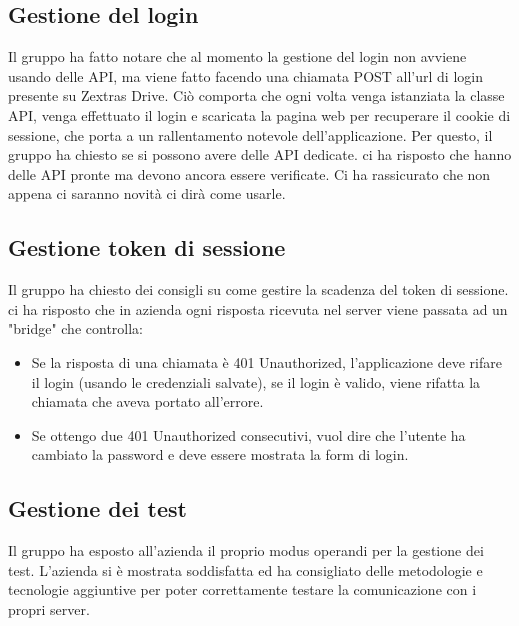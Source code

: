 \subsection{Gestione del login}
Il gruppo ha fatto notare che al momento la gestione del login non avviene usando delle API, ma viene fatto facendo una chiamata POST all'url di login presente su Zextras Drive.
Ciò comporta che ogni volta venga istanziata la classe API, venga effettuato il login e scaricata la pagina web per recuperare il cookie di sessione, che porta a un rallentamento notevole dell'applicazione. Per questo, il gruppo ha chiesto se si possono avere delle API dedicate. \textit{\Federico{}} ci ha risposto che hanno delle API pronte ma devono ancora essere verificate. Ci ha rassicurato che non appena ci saranno novità ci dirà come usarle.

\subsection{Gestione token di sessione}
Il gruppo ha chiesto dei consigli su come gestire la scadenza del token di sessione. \textit{\Alessio{}} ci ha risposto che in azienda ogni risposta ricevuta nel server viene passata ad un "bridge" che controlla:
\begin{itemize}
    \item Se la risposta di una chiamata è 401 Unauthorized, l'applicazione deve rifare il login (usando le credenziali salvate), se il login è valido, viene rifatta la chiamata che aveva portato all'errore.
    \item Se ottengo due 401 Unauthorized consecutivi, vuol dire che l'utente ha cambiato la password e deve essere mostrata la form di login.
\end{itemize}

\subsection{Gestione dei test}
Il gruppo ha esposto all'azienda il proprio modus operandi per la gestione dei test. L'azienda si è mostrata soddisfatta ed ha consigliato delle metodologie e tecnologie aggiuntive per poter correttamente testare la comunicazione con i propri server.

\newpage


